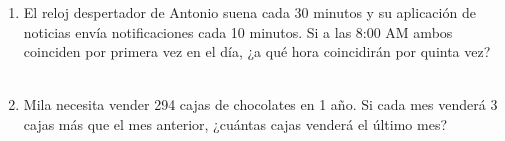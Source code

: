 \documentclass[11pt,letterpaper]{article}
\newenvironment{alternativas}{%
\begin{enumerate}[label=\Alph*), leftmargin=14pt, itemsep=2pt, topsep=2pt]
}{\end{enumerate}}
\begin{document}
\begin{enumerate}[label=\textbf{\arabic*.}, leftmargin=*, itemsep=7pt]
\item
\begin{minipage}[t]{\linewidth}
El reloj despertador de Antonio suena cada 30 minutos y su aplicación de noticias envía notificaciones cada 10 minutos. Si a las 8:00 AM ambos coinciden por primera vez en el día, ¿a qué hora coincidirán por quinta vez?\\
\\%
\begin{minipage}{\linewidth}
\vspace{7mm}
\end{minipage}
\vspace{7mm}
\end{minipage}

\item
\begin{minipage}[t]{\linewidth}
Mila necesita vender 294 cajas de chocolates en 1 año. Si cada mes venderá 3 cajas más que el mes anterior, ¿cuántas cajas venderá el último mes?\\
\\%
\begin{minipage}{\linewidth}
\vspace{7mm}
\end{minipage}
\vspace{7mm}
\end{minipage}


\end{enumerate}
\end{document}
